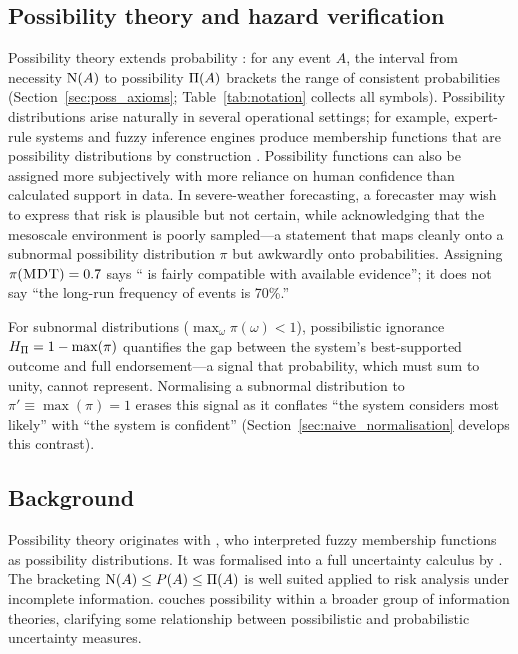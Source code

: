 \subsection{Possibility theory and hazard verification}

Possibility theory extends probability
\citep{Zadeh1978-je}:
for any event $A$, the interval
from necessity $\mathrm{N}(A)$ to possibility $\Pi(A)$
brackets the range of consistent probabilities
(Section~\ref{sec:poss_axioms};
Table~\ref{tab:notation} collects all symbols).
Possibility distributions arise naturally in several
operational settings;
for example, expert-rule systems and fuzzy inference
engines \citep[e.g.,][]{Chevrie1998-go} produce
membership functions that are possibility distributions
by construction \citep{Klir1995-va}.
Possibility functions can also be assigned more
subjectively with more reliance on human confidence
than calculated support in data.
In severe-weather forecasting, a
forecaster may wish to express that  risk is
plausible but not certain,
while acknowledging that the mesoscale environment is poorly
sampled---a statement that maps cleanly onto a subnormal possibility
distribution $\pi$ but awkwardly onto probabilities. Assigning
$\pi(\textsc{MDT}) = 0.7$ says `` is fairly compatible with
available evidence''; it does not say ``the long-run frequency of
 events is 70\%.''

For subnormal distributions ($\max_\omega \pi(\omega) < 1$),
possibilistic ignorance $H_{\Pi} = 1 - \max(\pi)$ quantifies the gap
between the system's best-supported outcome and full endorsement---a
signal that probability, which must sum to unity, cannot represent.
Normalising a subnormal distribution to
$\pi' \equiv \max(\pi) = 1$ erases this
signal as it conflates ``the
system considers  most likely'' with ``the system is
confident'' (Section~\ref{sec:naive_normalisation} develops this
contrast).

\subsection{Background}

Possibility theory originates with \citet{Zadeh1978-je},
who interpreted fuzzy membership functions as
possibility distributions. It was formalised
into a full uncertainty calculus by \citet{Dubois1988-nh}. The
bracketing $\mathrm{N}(A) \leq P(A) \leq \Pi(A)$ is well
suited applied to risk analysis under incomplete
information.
\citet{Klir1995-va} couches possibility within a
broader group of information theories,
clarifying some relationship between possibilistic
and probabilistic uncertainty measures.

